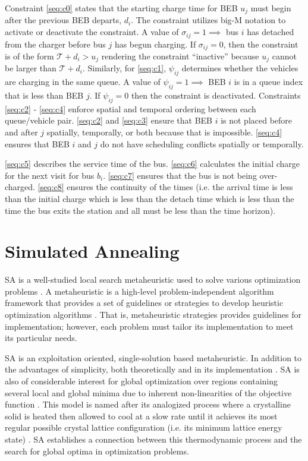 \documentclass[energies,article,submit,moreauthors]{Definitions/mdpi}
\newcommand{\T}{\mathcal{T}}                %
\begin{document}
Constraint \ref{seq:c0} states that the starting charge time for BEB \(u_j\) must begin after the previous BEB departs,
\(d_i\). The constraint utilizes big-M notation to activate or deactivate the constraint. A value of \(\sigma_{ij} = 1 \implies\)
bus \(i\) has detached from the charger before bus \(j\) has begun charging. If \(\sigma_{ij} = 0\), then the constraint is of the
form \(\T + d_i > u_j\) rendering the constraint ``inactive'' because \(u_j\) cannot be larger than \(\T + d_i\). Similarly, for
\ref{seq:c1}, \(\psi_{ij}\) determines whether the vehicles are charging in the same queue. A value of \(\psi_{ij} = 1 \implies\)
BEB \(i\) is in a queue index that is less than BEB \(j\). If \(\psi_{ij} = 0\) then the constraint is deactivated. Constraints
\ref{seq:c2} - \ref{seq:c4} enforce spatial and temporal ordering between each queue/vehicle pair. \ref{seq:c2} and
\ref{seq:c3} ensure that BEB \(i\) is not placed before and after \(j\) spatially, temporally, or both because that is
impossible. \ref{seq:c4} ensures that BEB \(i\) and \(j\) do not have scheduling conflicts spatially or temporally.

 \ref{seq:c5} describes the service time of the bus. \ref{seq:c6} calculates the initial charge for the next visit for
bus \(b_i\). \ref{seq:c7} ensures that the bus is not being over-charged. \ref{seq:c8} ensures the continuity of the times
(i.e. the arrival time is less than the initial charge which is less than the detach time which is less than the time
the bus exits the station and all must be less than the time horizon).
\section{Simulated Annealing}
\label{sec:simulated-annealing}
SA is a well-studied local search metaheuristic used to solve various optimization problems
\cite{gendreau-2018-handb-metah,press-1992-numer-recip}. A metaheuristic is a high-level problem-independent algorithm
framework that provides a set of guidelines or strategies to develop heuristic optimization algorithms
\cite{radosavljevic-2018-metah-optim}. That is, metaheuristic strategies provides guidelines for implementation;
however, each problem must tailor its implementation to meet its particular needs.

SA is an exploitation oriented, single-solution based metaheuristic. In addition to the advantages of simplicity, both
theoretically and in its implementation \cite{gendreau-2018-handb-metah,radosavljevic-2018-metah-optim}. SA is also of
considerable interest for global optimization over regions containing several local and global minima due to inherent
non-linearities of the objective function \cite{gendreau-2018-handb-metah}. This model is named after its analogized
process where a crystalline solid is heated then allowed to cool at a slow rate until it achieves its most regular
possible crystal lattice configuration (i.e. its minimum lattice energy state)
\cite{henderson-1989-theor-pract,press-1992-numer-recip}. SA establishes a connection between this thermodynamic
process and the search for global optima in optimization problems.
\end{document}
